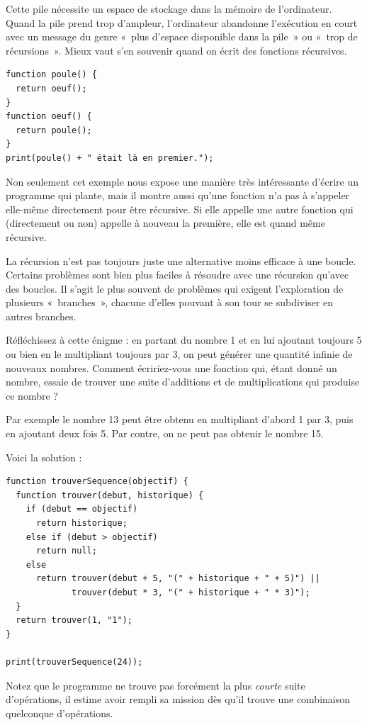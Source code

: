 \documentclass{FramateX}
\begin{document}
Cette pile nécessite un espace de stockage dans la mémoire de
l'ordinateur. Quand la pile prend trop d'ampleur, l'ordinateur abandonne
l'exécution en court avec un message du genre «~plus d'espace disponible
dans la pile~» ou «~trop de récursions~». Mieux vaut s'en souvenir quand
on écrit des fonctions récursives.

\begin{lstlisting}
function poule() {
  return oeuf();
}
function oeuf() {
  return poule();
}
print(poule() + " était là en premier.");
\end{lstlisting}
Non seulement cet exemple nous expose une manière très intéressante
d'écrire un programme qui plante, mais il montre aussi qu'une fonction
n'a pas à s'appeler elle-même directement pour être récursive. Si elle
appelle une autre fonction qui (directement ou non) appelle à nouveau la
première, elle est quand même récursive.

\begin{center}\end{center}

La récursion n'est pas toujours juste une alternative moins efficace à
une boucle. Certains problèmes sont bien plus faciles à résoudre avec
une récursion qu'avec des boucles. Il s'agit le plus souvent de
problèmes qui exigent l'exploration de plusieurs «~branches~», chacune
d'elles pouvant à son tour se subdiviser en autres branches.

Réfléchissez à cette énigme : en partant du nombre 1 et en lui ajoutant
toujours 5 ou bien en le multipliant toujours par 3, on peut générer une
quantité infinie de nouveaux nombres. Comment écririez-vous une fonction
qui, étant donné un nombre, essaie de trouver une suite d'additions et
de multiplications qui produise ce nombre ?

Par exemple le nombre 13 peut être obtenu en multipliant d'abord 1 par
3, puis en ajoutant deux fois 5. Par contre, on ne peut pas obtenir le
nombre 15.

Voici la solution :

\begin{lstlisting}
function trouverSequence(objectif) {
  function trouver(debut, historique) {
    if (debut == objectif)
      return historique;
    else if (debut > objectif)
      return null;
    else
      return trouver(debut + 5, "(" + historique + " + 5)") ||
             trouver(debut * 3, "(" + historique + " * 3)");
  }
  return trouver(1, "1");
}

print(trouverSequence(24));
\end{lstlisting}
Notez que le programme ne trouve pas forcément la plus \emph{courte}
suite d'opérations, il estime avoir rempli sa mission dès qu'il trouve
une combinaison quelconque d'opérations.
\end{document}
